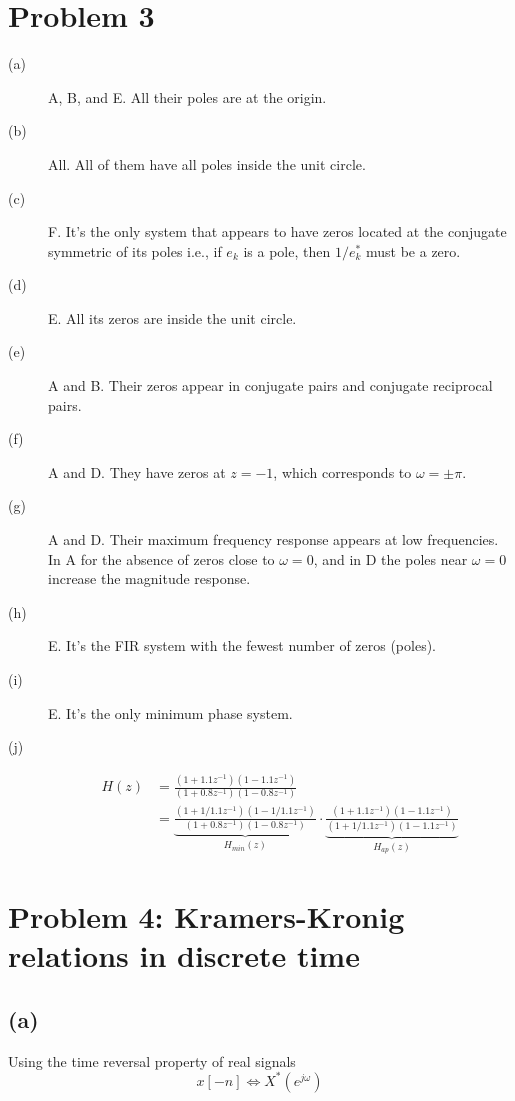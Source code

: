 \documentclass{article}
\begin{document}
\section{Problem 3}
\begin{description}
	\item[(a)] A, B, and E. All their poles are at the origin.
	\item[(b)] All. All of them have all poles inside the unit circle.
	\item[(c)] F. It's the only system that appears to have zeros located at the conjugate symmetric of its poles i.e., if $e_k$ is a pole, then $1/e_k^*$ must be a zero.
	\item[(d)] E. All its zeros are inside the unit circle.
	\item[(e)] A and B. Their zeros appear in conjugate pairs and conjugate reciprocal pairs.
	\item[(f)] A and D. They have zeros at $z = -1$, which corresponds to $\omega = \pm\pi$.
	\item[(g)] A and D. Their maximum frequency response appears at low frequencies. In A for the absence of zeros close to $\omega =0$, and in D the poles near  $\omega =0$ increase the magnitude response.
	\item[(h)] E. It's the FIR system with the fewest number of zeros (poles).
	\item[(i)] E. It's the only minimum phase system.
	\item[(j)] 
	\begin{align}\nonumber
	H(z) &= \frac{(1 + 1.1z^{-1})(1 - 1.1z^{-1})}{(1 + 0.8z^{-1})(1 -0.8z^{-1})} \\
	&=\underbrace{\frac{(1 + 1/1.1z^{-1})(1 - 1/1.1z^{-1})}{(1 + 0.8z^{-1})(1 -0.8z^{-1})}}_{H_{min}(z)}\cdot\underbrace{\frac{(1 + 1.1z^{-1})(1 - 1.1z^{-1})}{(1 + 1/1.1z^{-1})(1 -1.1z^{-1})}}_{H_{ap}(z)}
	\end{align}
	
\end{description}	
	
\section{Problem 4: Kramers-Kronig relations in discrete time}
\subsection{(a)}

Using the time reversal property of real signals
\begin{equation}
x[-n] \Longleftrightarrow X^*(e^{j\omega}) \tag{time reversal of real signals}
\end{equation}
\end{document}
